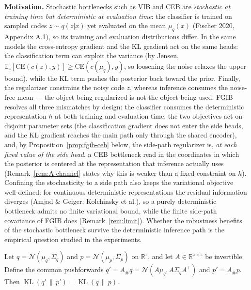 \textbf{Motivation.}
Stochastic bottlenecks such as VIB and CEB are \emph{stochastic at training time but
deterministic at evaluation time}: the classifier is trained on sampled codes
$z \sim q(z|x)$ yet evaluated on the mean $\mu_q(x)$ (Fischer 2020, Appendix A.1), so
its training and evaluation distributions differ. In the same models the cross-entropy
gradient and the KL gradient act on the same heads: the classification term can exploit
the variance (by Jensen, $\mathbb{E}_z[\mathrm{CE}(c(z), y)] \ge \mathrm{CE}(c(\mu_q),
y)$, so loosening the noise relaxes the upper bound), while the KL term pushes the
posterior back toward the prior. Finally, the regularizer constrains the noisy code $z$,
whereas inference consumes the noise-free mean --- the object being regularized is not
the object being used. FGIB resolves all three mismatches by design: the classifier
consumes the deterministic representation $h$ at both training and evaluation time, the
two objectives act on disjoint parameter sets (the classification gradient does not
enter the side heads, and the KL gradient reaches the main path only through the shared
encoder), and, by Proposition~\ref{prop:fgib-ceb} below, the side-path regularizer is,
\emph{at each fixed value of the side head}, a CEB bottleneck read in the coordinates in
which the posterior is centered at the representation that inference actually uses
(Remark~\ref{rem:A-channel} states why this is weaker than a fixed constraint on $h$).
Confining the stochasticity to a side path also keeps the variational objective
well-defined: for continuous deterministic representations the residual information
diverges (Amjad \& Geiger; Kolchinsky et al.), so a purely deterministic bottleneck
admits no finite variational bound, while the finite side-path covariance of FGIB does
(Remark~\ref{rem:limit}). Whether the robustness benefits of the stochastic bottleneck
survive the deterministic inference path is the empirical question studied in the
experiments.

\begin{lemma}\label{lem:kl-invariance}
Let $q = \mathcal{N}(\mu_q, \Sigma_q)$ and $p = \mathcal{N}(\mu_p, \Sigma_p)$ on
$\mathbb{R}^{z}$, and let $A \in \mathbb{R}^{z \times z}$ be invertible. Define the
common pushforwards $q' = A_\# q = \mathcal{N}(A\mu_q, A\Sigma_q A^\top)$ and
$p' = A_\# p$. Then $\operatorname{KL}(q'\,\|\,p') = \operatorname{KL}(q\,\|\,p)$.
\end{lemma}

